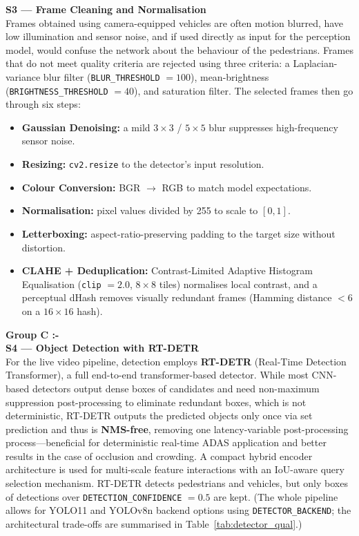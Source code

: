 \documentclass[conference]{IEEEtran}
\begin{document}
\textbf{S3 --- Frame Cleaning and Normalisation} \\
Frames obtained using camera-equipped vehicles are often motion blurred, have low illumination and sensor noise, and if used directly as input for the perception model, would confuse the network about the behaviour of the pedestrians. Frames that do not meet quality criteria are rejected using three criteria: a Laplacian-variance blur filter (\texttt{BLUR\_THRESHOLD} $= 100$), mean-brightness (\texttt{BRIGHTNESS\_THRESHOLD} $= 40$), and saturation filter. The selected frames then go through six steps:
\begin{itemize}
    \item \textbf{Gaussian Denoising:} a mild $3\times3$ / $5\times5$ blur suppresses high-frequency sensor noise.
    \item \textbf{Resizing:} \texttt{cv2.resize} to the detector's input resolution.
    \item \textbf{Colour Conversion:} BGR $\rightarrow$ RGB to match model expectations.
    \item \textbf{Normalisation:} pixel values divided by 255 to scale to $[0,1]$.
    \item \textbf{Letterboxing:} aspect-ratio-preserving padding to the target size without distortion.
    \item \textbf{CLAHE + Deduplication:} Contrast-Limited Adaptive Histogram Equalisation (\texttt{clip} $=2.0$, $8\times8$ tiles) normalises local contrast, and a perceptual dHash removes visually redundant frames (Hamming distance $< 6$ on a $16\times16$ hash).
\end{itemize}
\vspace{8pt}
\noindent\textbf{Group C :-}
\mbox{}\\
\textbf{S4 --- Object Detection with RT-DETR} \\
For the live video pipeline, detection employs \textbf{RT-DETR} (Real-Time Detection Transformer), a full end-to-end transformer-based detector. While most CNN-based detectors output dense boxes of candidates and need non-maximum suppression post-processing to eliminate redundant boxes, which is not deterministic, RT-DETR outputs the predicted objects only once via set prediction and thus is \textbf{NMS-free}, removing one latency-variable post-processing process---beneficial for deterministic real-time ADAS application and better results in the case of occlusion and crowding. A compact hybrid encoder architecture is used for multi-scale feature interactions with an IoU-aware query selection mechanism. RT-DETR detects pedestrians and vehicles, but only boxes of detections over \texttt{DETECTION\_CONFIDENCE} $= 0.5$ are kept. (The whole pipeline allows for YOLO11 and YOLOv8n backend options using \texttt{DETECTOR\_BACKEND}; the architectural trade-offs are summarised in Table~\ref{tab:detector_qual}.)
\end{document}
